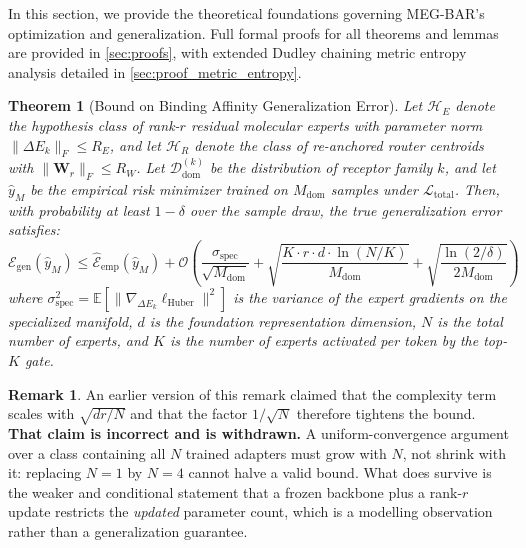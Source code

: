 \documentclass{article}
\newtheorem{theorem}{Theorem}
\theoremstyle{definition}
\newtheorem{remark}{Remark}
\begin{document}
In this section, we provide the theoretical foundations governing MEG-BAR's optimization and generalization. Full formal proofs for all theorems and lemmas are provided in \cref{sec:proofs}, with extended Dudley chaining metric entropy analysis detailed in \cref{sec:proof_metric_entropy}.

\begin{theorem}[Bound on Binding Affinity Generalization Error]
\label{thm:generalization_bound}
Let $\mathcal{H}_E$ denote the hypothesis class of rank-$r$ residual molecular experts with parameter norm $\|\Delta E_k\|_F \le R_E$, and let $\mathcal{H}_R$ denote the class of re-anchored router centroids with $\|\mathbf{W}_r\|_F \le R_W$. Let $\mathcal{D}_{\text{dom}}^{(k)}$ be the distribution of receptor family $k$, and let $\hat{y}_M$ be the empirical risk minimizer trained on $M_{\text{dom}}$ samples under $\mathcal{L}_{\text{total}}$. Then, with probability at least $1 - \delta$ over the sample draw, the true generalization error satisfies:
\begin{equation}
\mathcal{E}_{\text{gen}}(\hat{y}_M) \le \hat{\mathcal{E}}_{\text{emp}}(\hat{y}_M) + \mathcal{O}\left( \frac{\sigma_{\text{spec}}}{\sqrt{M_{\text{dom}}}} + \sqrt{\frac{K \cdot r \cdot d \cdot \ln(N/K)}{M_{\text{dom}}}} + \sqrt{\frac{\ln(2/\delta)}{2 M_{\text{dom}}}} \right)
\end{equation}
where $\sigma_{\text{spec}}^2 = \mathbb{E}[\|\nabla_{\Delta E_k} \ell_{\text{Huber}}\|^2]$ is the variance of the expert gradients on the specialized manifold, $d$ is the foundation representation dimension, $N$ is the total number of experts, and $K$ is the number of experts activated per token by the top-$K$ gate.
\end{theorem}

\begin{remark}
An earlier version of this remark claimed that the complexity term scales with $\sqrt{dr/N}$ and that the factor $1/\sqrt{N}$ therefore tightens the bound. \textbf{That claim is incorrect and is withdrawn.} A uniform-convergence argument over a class containing all $N$ trained adapters must grow with $N$, not shrink with it: replacing $N=1$ by $N=4$ cannot halve a valid bound. What does survive is the weaker and conditional statement that a frozen backbone plus a rank-$r$ update restricts the \emph{updated} parameter count, which is a modelling observation rather than a generalization guarantee.
\end{remark}
\end{document}

